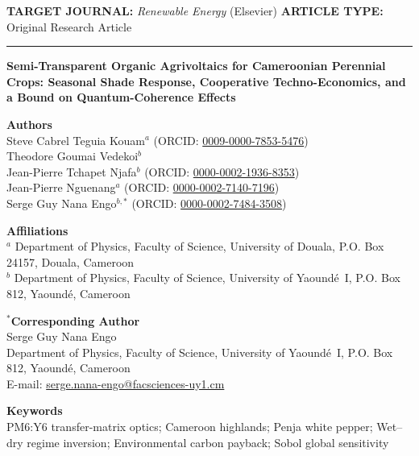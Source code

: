 \documentclass[10pt,a4paper]{article}
\begin{document}
\noindent
\textbf{\small TARGET JOURNAL:} \textit{Renewable Energy} (Elsevier) \hfill \textbf{\small ARTICLE TYPE:} Original Research Article\\[0.4em]
\rule{\textwidth}{0.6pt}

\vspace{0.6em}
\begin{center}
{\Large\bfseries Semi-Transparent Organic Agrivoltaics for Cameroonian Perennial Crops: Seasonal Shade Response, Cooperative Techno-Economics, and a Bound on Quantum-Coherence Effects}
\end{center}

\vspace{0.5em}
\noindent
\textbf{Authors}\\[0.25em]
Steve Cabrel Teguia Kouam$^{a}$ (ORCID: \href{https://orcid.org/0009-0000-7853-5476}{0009-0000-7853-5476})\\
Theodore Goumai Vedekoi$^{b}$\\
Jean-Pierre Tchapet Njafa$^{b}$ (ORCID: \href{https://orcid.org/0000-0002-1936-8353}{0000-0002-1936-8353})\\
Jean-Pierre Nguenang$^{a}$ (ORCID: \href{https://orcid.org/0000-0002-7140-7196}{0000-0002-7140-7196})\\
Serge Guy Nana Engo$^{b,\ast}$ (ORCID: \href{https://orcid.org/0000-0002-7484-3508}{0000-0002-7484-3508})

\vspace{0.4em}
\noindent
\textbf{Affiliations}\\
$^{a}$ Department of Physics, Faculty of Science, University of Douala, P.O. Box 24157, Douala, Cameroon\\
$^{b}$ Department of Physics, Faculty of Science, University of Yaound\'e~I, P.O. Box 812, Yaound\'e, Cameroon

\vspace{0.4em}
\noindent
\textbf{$^\ast$Corresponding Author}\\
Serge Guy Nana Engo\\
Department of Physics, Faculty of Science, University of Yaound\'e~I, P.O. Box 812, Yaound\'e, Cameroon\\
E-mail: \href{mailto:serge.nana-engo@facsciences-uy1.cm}{serge.nana-engo@facsciences-uy1.cm}

\vspace{0.4em}
\noindent
\textbf{Keywords}\\
PM6:Y6 transfer-matrix optics; Cameroon highlands; Penja white pepper; Wet--dry regime inversion; Environmental carbon payback; Sobol global sensitivity
\end{document}
